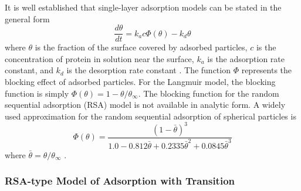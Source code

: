 It is well established that single-layer adsorption models can be
stated in the general form\begin{equation}
\frac{d\theta}{dt}=k_{a}c\Phi\left(\theta\right)-k_{d}\theta\label{eq:Single Layer Kinetics}\end{equation}
where $\theta$ is the fraction of the surface covered by adsorbed
particles, $c$ is the concentration of protein in solution near the
surface, $k_{a}$ is the adsorption rate constant, and $k_{d}$ is
the desorption rate constant \cite{Andrade1986}. The function $\Phi$
represents the blocking effect of adsorbed particles. For the Langmuir
model, the blocking function is simply $\Phi\left(\theta\right)=1-\theta/\theta_{\infty}$.
The blocking function for the random sequential adsorption (RSA) model
is not available in analytic form. A widely used approximation for
the random sequential adsorption of spherical particles is\begin{equation}
\Phi\left(\theta\right)=\frac{\left(1-\bar{\theta}\right)^{3}}{1.0-0.812\bar{\theta}+0.2335\bar{\theta}^{2}+0.0845\bar{\theta}^{3}}\label{eq:RSA Blocking Function}\end{equation}
where $\bar{\theta}=\theta/\theta_{\infty}$ \cite{Schaaf1989}.


\subsubsection{RSA-type Model of Adsorption with Transition}

